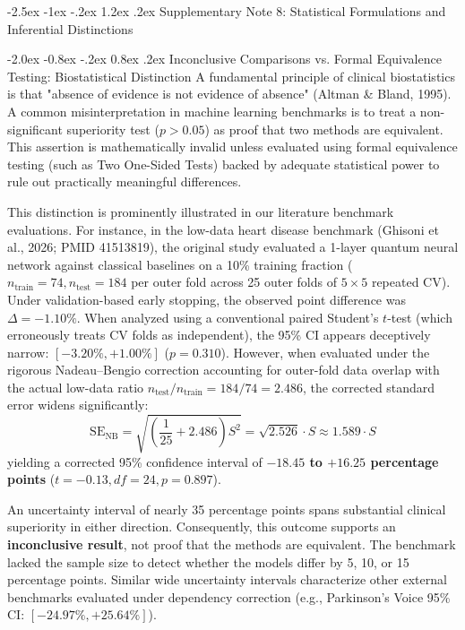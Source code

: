 \documentclass[10pt,a4paper]{article}
\makeatletter
\renewcommand{\section}{\@startsection{section}{1}{\z@}%
  {-2.5ex \@plus -1ex \@minus -.2ex}%
  {1.2ex \@plus.2ex}%
  {\normalfont\Large\sffamily\bfseries\color{naturedark}}}
\renewcommand{\subsection}{\@startsection{subsection}{2}{\z@}%
  {-2.0ex \@plus -0.8ex \@minus -.2ex}%
  {0.8ex \@plus.2ex}%
  {\normalfont\large\sffamily\bfseries\color{naturedark}}}
\makeatother
\begin{document}
\newpage

\section{Supplementary Note 8: Statistical Formulations and Inferential Distinctions}

\subsection{Inconclusive Comparisons vs. Formal Equivalence Testing: Biostatistical Distinction}
A fundamental principle of clinical biostatistics is that "absence of evidence is not evidence of absence" (Altman \& Bland, 1995). A common misinterpretation in machine learning benchmarks is to treat a non-significant superiority test ($p > 0.05$) as proof that two methods are equivalent. This assertion is mathematically invalid unless evaluated using formal equivalence testing (such as Two One-Sided Tests) backed by adequate statistical power to rule out practically meaningful differences.

This distinction is prominently illustrated in our literature benchmark evaluations. For instance, in the low-data heart disease benchmark (Ghisoni et al., 2026; PMID 41513819), the original study evaluated a 1-layer quantum neural network against classical baselines on a 10\% training fraction ($n_{\text{train}} = 74, n_{\text{test}} = 184$ per outer fold across 25 outer folds of $5 \times 5$ repeated CV). Under validation-based early stopping, the observed point difference was $\Delta = -1.10\%$. When analyzed using a conventional paired Student's $t$-test (which erroneously treats CV folds as independent), the 95\% CI appears deceptively narrow: $[-3.20\%, +1.00\%]$ ($p = 0.310$). However, when evaluated under the rigorous Nadeau--Bengio correction accounting for outer-fold data overlap with the actual low-data ratio $n_{\text{test}} / n_{\text{train}} = 184 / 74 = 2.486$, the corrected standard error widens significantly:
\begin{equation}
\text{SE}_{\text{NB}} = \sqrt{\left(\frac{1}{25} + 2.486\right) S^2} = \sqrt{2.526} \cdot S \approx 1.589 \cdot S
\end{equation}
yielding a corrected 95\% confidence interval of \textbf{$-18.45$ to $+16.25$ percentage points} ($t = -0.13, df = 24, p = 0.897$).

An uncertainty interval of nearly 35 percentage points spans substantial clinical superiority in either direction. Consequently, this outcome supports an \textbf{inconclusive result}, not proof that the methods are equivalent. The benchmark lacked the sample size to detect whether the models differ by 5, 10, or 15 percentage points. Similar wide uncertainty intervals characterize other external benchmarks evaluated under dependency correction (e.g., Parkinson's Voice 95\% CI: $[-24.97\%, +25.64\%]$).
\end{document}
